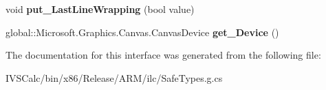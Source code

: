 \begin{DoxyCompactItemize}
\mbox{\label{interface_microsoft_1_1_graphics_1_1_canvas_1_1_text_1_1_i_canvas_text_layout_adeb3fc37708660c2d3ff7a49349a4f43}} 
void {\bfseries put\+\_\+\+Last\+Line\+Wrapping} (bool value)
\item 
\mbox{\label{interface_microsoft_1_1_graphics_1_1_canvas_1_1_text_1_1_i_canvas_text_layout_ac15a95c4a7796e189425d1953df24949}} 
global\+::\+Microsoft.\+Graphics.\+Canvas.\+Canvas\+Device {\bfseries get\+\_\+\+Device} ()
\end{DoxyCompactItemize}


The documentation for this interface was generated from the following file\+:\begin{DoxyCompactItemize}
\item 
I\+V\+S\+Calc/bin/x86/\+Release/\+A\+R\+M/ilc/Safe\+Types.\+g.\+cs\end{DoxyCompactItemize}
